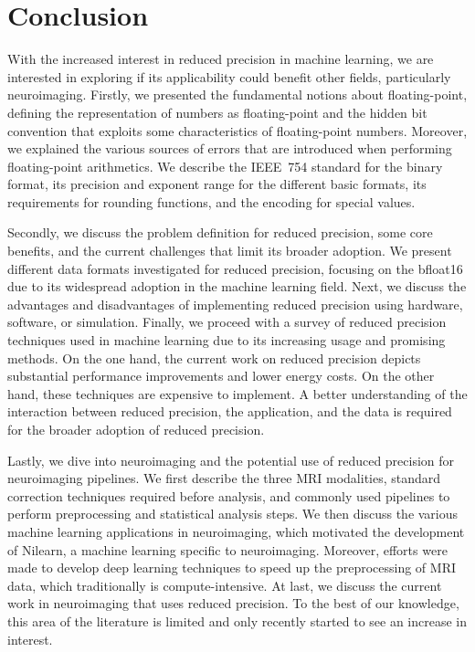 \chapter{Conclusion}
\label{ch:conclusion}
With the increased interest in reduced precision in machine learning, we are interested
in exploring if its applicability could benefit other fields, particularly neuroimaging.
Firstly, we presented the fundamental notions about floating-point, defining the representation
of numbers as floating-point and the hidden bit convention that exploits some characteristics
of floating-point numbers.
Moreover, we explained the various sources of errors that are introduced when performing
floating-point arithmetics.
We describe the IEEE~754 standard for the binary format, its precision and
exponent range for the different basic formats, its requirements
for rounding functions, and the encoding for special values.

Secondly, we discuss the problem definition for reduced precision, some core benefits,
and the current challenges that limit its broader adoption.
We present different data formats investigated for reduced precision, focusing on
the bfloat16 due to its widespread adoption in the machine learning field.
Next, we discuss the advantages and disadvantages of implementing reduced precision
using hardware, software, or simulation. 
Finally, we proceed with a survey of reduced precision techniques used in machine
learning due to its increasing usage and promising methods.
On the one hand, the current work on reduced precision depicts substantial
performance improvements and lower energy costs. 
On the other hand, these techniques are expensive to implement.
A better understanding of the interaction between reduced precision, the
application, and the data is required for the broader adoption of reduced precision.

Lastly, we dive into neuroimaging and the potential use of reduced precision for neuroimaging pipelines. We first describe the three MRI modalities, standard correction techniques required before analysis, and commonly used pipelines to perform preprocessing and statistical analysis steps. We then discuss the various machine learning applications in neuroimaging, which motivated the development of Nilearn, a machine learning specific to neuroimaging. Moreover, efforts were made to develop deep learning techniques to speed up the preprocessing of MRI data, which traditionally is compute-intensive. At last, we discuss the current work in neuroimaging that uses reduced precision. To the best of our knowledge, this area of the literature is limited and only recently started to see an increase in interest.

